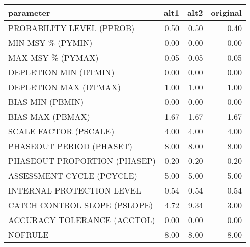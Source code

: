 \begin{table}[ht]
\centering
\begin{tabular}{lrrr}
 parameter & alt1 & alt2 & original \\ 
  \hline
PROBABILITY LEVEL (PPROB)      & 0.50 & 0.50 & 0.40 \\ 
   \hline
MIN MSY \% (PYMIN)              & 0.00 & 0.00 & 0.00 \\ 
  MAX MSY \% (PYMAX)              & 0.05 & 0.05 & 0.05 \\ 
  DEPLETION MIN (DTMIN)          & 0.00 & 0.00 & 0.00 \\ 
  DEPLETION MAX (DTMAX)          & 1.00 & 1.00 & 1.00 \\ 
  BIAS MIN (PBMIN)               & 0.00 & 0.00 & 0.00 \\ 
  BIAS MAX (PBMAX)               & 1.67 & 1.67 & 1.67 \\ 
  SCALE FACTOR (PSCALE)          & 4.00 & 4.00 & 4.00 \\ 
  PHASEOUT PERIOD (PHASET)       & 8.00 & 8.00 & 8.00 \\ 
  PHASEOUT PROPORTION (PHASEP)   & 0.20 & 0.20 & 0.20 \\ 
  ASSESSMENT CYCLE (PCYCLE)      & 5.00 & 5.00 & 5.00 \\ 
  INTERNAL PROTECTION LEVEL      & 0.54 & 0.54 & 0.54 \\ 
  CATCH CONTROL SLOPE (PSLOPE)   & 4.72 & 9.34 & 3.00 \\ 
  ACCURACY TOLERANCE (ACCTOL)    & 0.00 & 0.00 & 0.00 \\ 
  NOFRULE                        & 8.00 & 8.00 & 8.00 \\ 
   \hline
\end{tabular}
\end{table}
